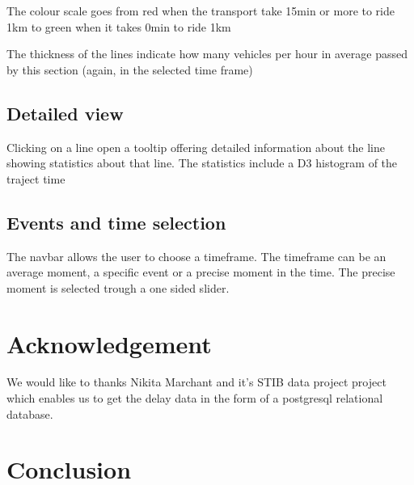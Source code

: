 \documentclass[11pt]{article}%
\begin{document}
The colour scale goes from red when the transport take 15min or more to ride 1km to green when it takes 0min to ride 1km

The thickness of the lines indicate how many vehicles per hour in average passed by this section (again, in the selected time frame)


\subsection{Detailed view}



Clicking on a line open a tooltip offering detailed information about the line showing statistics about that line. The statistics include a D3 histogram of the traject time



\subsection{Events and time selection}

The navbar allows the user to choose a timeframe. The timeframe can be an average moment, a specific event or a precise moment in the time. The precise moment is selected trough a one sided slider.

\section{Acknowledgement}

We would like to thanks Nikita Marchant and it's STIB data project \cite{nikita} project which enables us to get the delay data in the form of a postgresql relational database.

\section{Conclusion}
\end{document}
